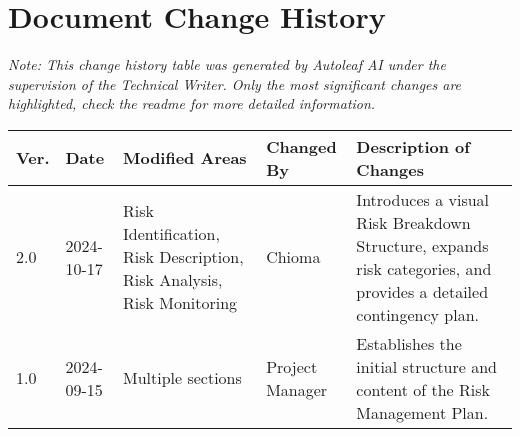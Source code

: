 \section{Document Change History}

\begin{center}
\small\textit{Note: This change history table was generated by Autoleaf AI under the supervision of the Technical Writer. Only the most significant changes are highlighted, check the readme for more detailed information.}

\vspace{0.5cm}

\begin{tabular}{|p{}|p{}|p{}|p{}|p{}|}
\hline
\textbf{Ver.} & \textbf{Date} & \textbf{Modified Areas} & \textbf{Changed By} & \textbf{Description of Changes} \\
\hline
2.0 & 2024-10-17 & Risk Identification, Risk Description, Risk Analysis, Risk Monitoring & Chioma & Introduces a visual Risk Breakdown Structure, expands risk categories, and provides a detailed contingency plan. \\
\hline
1.0 & 2024-09-15 &  Multiple sections & Project Manager & Establishes the initial structure and content of the Risk Management Plan. \\
\hline
\end{tabular}
\end{center}

\vspace{1cm} 
